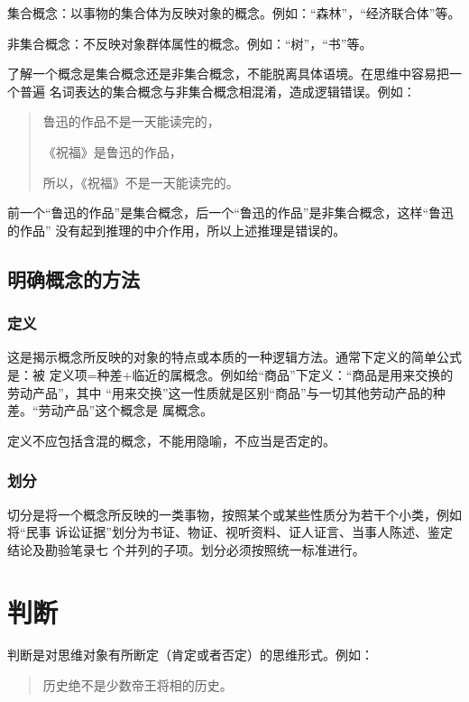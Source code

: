 \documentclass[final,oneside]{ctexbook}
\newenvironment{equotation}{\begin{quotation}\kaishu}{\end{quotation}}
\begin{document}
集合概念：以事物的集合体为反映对象的概念。例如：“森林”，“经济联合体”等。

非集合概念：不反映对象群体属性的概念。例如：“树”，“书”等。

了解一个概念是集合概念还是非集合概念，不能脱离具体语境。在思维中容易把一个普遍
名词表达的集合概念与非集合概念相混淆，造成逻辑错误。例如：
\begin{equotation}
  鲁迅的作品不是一天能读完的，

  《祝福》是鲁迅的作品，

  所以，《祝福》不是一天能读完的。
\end{equotation}
前一个“鲁迅的作品”是集合概念，后一个“鲁迅的作品”是非集合概念，这样“鲁迅的作品”
没有起到推理的中介作用，所以上述推理是错误的。

\subsection{明确概念的方法}

\subsubsection{定义}

这是揭示概念所反映的对象的特点或本质的一种逻辑方法。通常下定义的简单公式是：被
定义项=种差+临近的属概念。例如给“商品”下定义：“商品是用来交换的劳动产品”，其中
“用来交换”这一性质就是区别“商品”与一切其他劳动产品的种差。“劳动产品”这个概念是
属概念。

定义不应包括含混的概念，不能用隐喻，不应当是否定的。

\subsubsection{划分}

切分是将一个概念所反映的一类事物，按照某个或某些性质分为若干个小类，例如将“民事
诉讼证据”划分为书证、物证、视听资料、证人证言、当事人陈述、鉴定结论及勘验笔录七
个并列的子项。划分必须按照统一标准进行。

\section{判断}

判断是对思维对象有所断定（肯定或者否定）的思维形式。例如：
\begin{equotation}
  历史绝不是少数帝王将相的历史。
\end{equotation}
\end{document}
